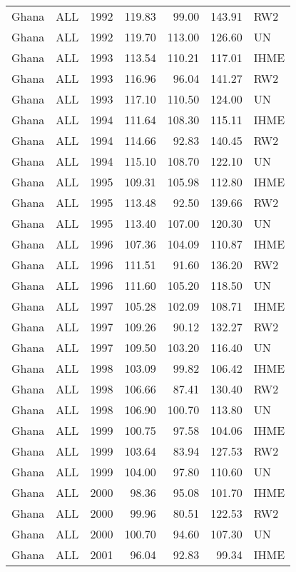 \begin{longtable}{lllrrrl}
  Ghana & ALL & 1992 & 119.83 & 99.00 & 143.91 & RW2 \\ 
  Ghana & ALL & 1992 & 119.70 & 113.00 & 126.60 & UN \\ 
  Ghana & ALL & 1993 & 113.54 & 110.21 & 117.01 & IHME \\ 
  Ghana & ALL & 1993 & 116.96 & 96.04 & 141.27 & RW2 \\ 
  Ghana & ALL & 1993 & 117.10 & 110.50 & 124.00 & UN \\ 
  Ghana & ALL & 1994 & 111.64 & 108.30 & 115.11 & IHME \\ 
  Ghana & ALL & 1994 & 114.66 & 92.83 & 140.45 & RW2 \\ 
  Ghana & ALL & 1994 & 115.10 & 108.70 & 122.10 & UN \\ 
  Ghana & ALL & 1995 & 109.31 & 105.98 & 112.80 & IHME \\ 
  Ghana & ALL & 1995 & 113.48 & 92.50 & 139.66 & RW2 \\ 
  Ghana & ALL & 1995 & 113.40 & 107.00 & 120.30 & UN \\ 
  Ghana & ALL & 1996 & 107.36 & 104.09 & 110.87 & IHME \\ 
  Ghana & ALL & 1996 & 111.51 & 91.60 & 136.20 & RW2 \\ 
  Ghana & ALL & 1996 & 111.60 & 105.20 & 118.50 & UN \\ 
  Ghana & ALL & 1997 & 105.28 & 102.09 & 108.71 & IHME \\ 
  Ghana & ALL & 1997 & 109.26 & 90.12 & 132.27 & RW2 \\ 
  Ghana & ALL & 1997 & 109.50 & 103.20 & 116.40 & UN \\ 
  Ghana & ALL & 1998 & 103.09 & 99.82 & 106.42 & IHME \\ 
  Ghana & ALL & 1998 & 106.66 & 87.41 & 130.40 & RW2 \\ 
  Ghana & ALL & 1998 & 106.90 & 100.70 & 113.80 & UN \\ 
  Ghana & ALL & 1999 & 100.75 & 97.58 & 104.06 & IHME \\ 
  Ghana & ALL & 1999 & 103.64 & 83.94 & 127.53 & RW2 \\ 
  Ghana & ALL & 1999 & 104.00 & 97.80 & 110.60 & UN \\ 
  Ghana & ALL & 2000 & 98.36 & 95.08 & 101.70 & IHME \\ 
  Ghana & ALL & 2000 & 99.96 & 80.51 & 122.53 & RW2 \\ 
  Ghana & ALL & 2000 & 100.70 & 94.60 & 107.30 & UN \\ 
  Ghana & ALL & 2001 & 96.04 & 92.83 & 99.34 & IHME \\ 

\end{longtable}
